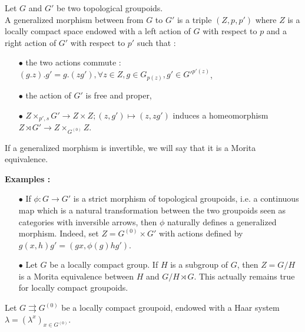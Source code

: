 \begin{definition}
Let $G$ and $G'$ be two topological groupoids.\\ 
A generalized morphism between from $G$ to $G'$ is a triple $(Z,p,p')$ where $Z$ is a locally compact space endowed with a left action of $G$ with respect to $p$ and a right action of $G'$ with respect to $p'$ such that :
\begin{itemize}
\item[$\bullet$] the two actions commute : $(g.z).g'=g.(zg'),\forall z\in Z,g\in G_{p(z)},g'\in G'^{p'(z)}$,
\item[$\bullet$] the action of $G'$ is free and proper,
\item[$\bullet$] $Z\times_{p',s} G'\rightarrow Z\times Z ; (z,g')\mapsto (z,zg')$ induces a homeomorphism $Z\rtimes G' \rightarrow Z\times_{G^{(0)}} Z$.\\
\end{itemize}
If a generalized morphism is invertible, we will say that it is a Morita equivalence.
\end{definition}

\textbf{Examples :}
\begin{itemize}
\item[$\bullet$] If $\phi : G\rightarrow G'$ is a strict morphism of topological groupoids, i.e. a continuous map which is a natural transformation between the two groupoids seen as categories with inversible arrows, then $\phi$ naturally defines a generalized morphism. Indeed, set $Z = G^{(0)}\times G'$ with actions defined by $g(x,h)g' = (gx, \phi(g)hg')$.
\item[$\bullet$] Let $G$ be a locally compact group. If $H$ is a subgroup of $G$, then $Z=G/H$ is a Morita equivalence between $H$ and $G/H\rtimes G$. This actually remains true for locally compact groupoids.\\
\end{itemize}

Let $G \rightrightarrows G^{(0)}$ be a locally compact groupoid, endowed with a Haar system $\lambda = (\lambda^x)_{x\in G^{(0)}}$.\\

